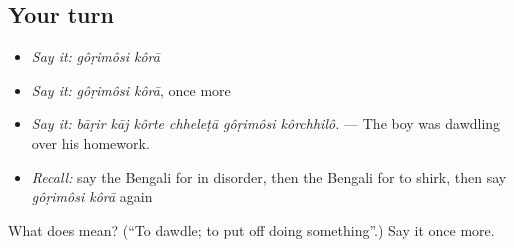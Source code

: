 \subsection*{Your turn}
\begin{itemize}
\raggedright
  \item \emph{Say it:} \emph{gôṛimôsi kôrā}
  \item \emph{Say it:} \emph{gôṛimôsi kôrā}, once more
  \item \emph{Say it:} \emph{bāṛir kāj kôrte chheleṭā gôṛimôsi kôrchhilô.} — The boy was dawdling over his homework.
  \item \emph{Recall:} say the Bengali for in disorder, then the Bengali for to shirk, then say \emph{gôṛimôsi kôrā} again
\end{itemize}

\begin{tcolorbox}[breakable,colback=teal!4,colframe=teal!35!black,title={Before you move on}]
What does   mean? (\textquotedblleft{}To dawdle; to put off doing something\textquotedblright{}.) Say it once more.
\end{tcolorbox}
